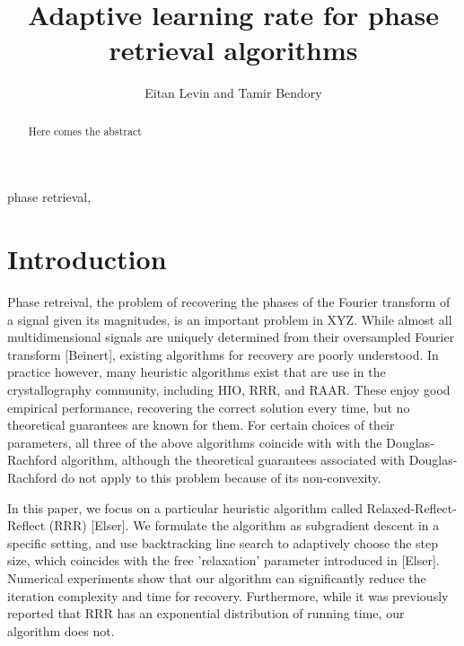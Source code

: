 \documentclass[journal]{IEEEtran}
\theoremstyle{definition}
\theoremstyle{remark}
\theoremstyle{definition}
\theoremstyle{problem}
\theoremstyle{definition}
\begin{document}
\title{Adaptive learning rate for phase retrieval algorithms}

\author{Eitan Levin and Tamir Bendory}
\maketitle

\begin{abstract}
	Here comes the abstract
\end{abstract}

\begin{IEEEkeywords}
phase retrieval, 	
\end{IEEEkeywords}
	
\section{Introduction}
Phase retreival, the problem of recovering the phases of the Fourier transform of a signal given its magnitudes, is an important problem in XYZ. While almost all multidimensional signals are uniquely determined from their oversampled Fourier transform [Beinert], existing algorithms for recovery are poorly understood. In practice however, many heuristic algorithms exist that are use in the crystallography community, including HIO, RRR, and RAAR. These enjoy good empirical performance, recovering the correct solution every time, but no theoretical guarantees are known for them. For certain choices of their parameters, all three of the above algorithms coincide with with the Douglas-Rachford algorithm, although the theoretical guarantees associated with Douglas-Rachford do not apply to this problem because of its non-convexity. 

In this paper, we focus on a particular heuristic algorithm called Relaxed-Reflect-Reflect (RRR) [Elser]. We formulate the algorithm as subgradient descent in a specific setting, and use backtracking line search to adaptively choose the step size, which coincides with the free 'relaxation' parameter introduced in [Elser]. Numerical experiments show that our algorithm can significantly reduce the iteration complexity and time for recovery. Furthermore, while it was previously reported that RRR has an exponential distribution of running time, our algorithm does not.
\end{document}
